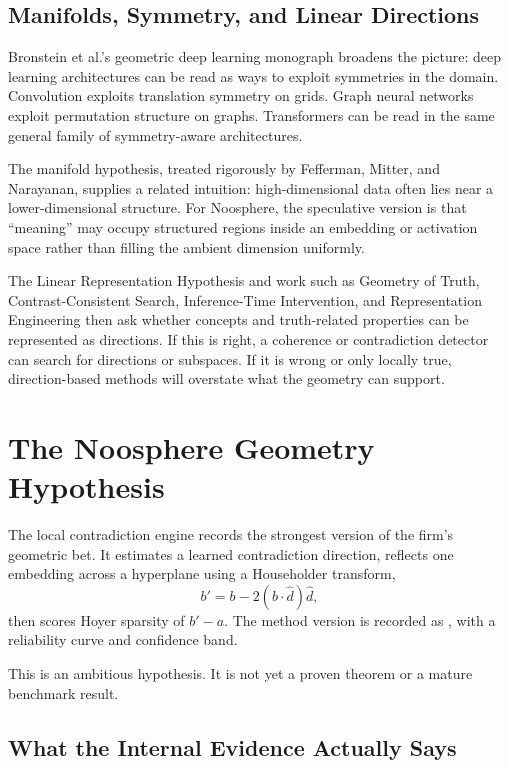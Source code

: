 \documentclass[11pt]{article}
\newcommand{\code}[1]{\texttt{\detokenize{#1}}}
\begin{document}
\subsection{Manifolds, Symmetry, and Linear Directions}

Bronstein et al.'s geometric deep learning monograph broadens the picture: deep
learning architectures can be read as ways to exploit symmetries in the domain.
Convolution exploits translation symmetry on grids. Graph neural networks
exploit permutation structure on graphs. Transformers can be read in the same
general family of symmetry-aware architectures.

The manifold hypothesis, treated rigorously by Fefferman, Mitter, and
Narayanan, supplies a related intuition: high-dimensional data often lies near a
lower-dimensional structure. For Noosphere, the speculative version is that
``meaning'' may occupy structured regions inside an embedding or activation
space rather than filling the ambient dimension uniformly.

The Linear Representation Hypothesis and work such as Geometry of Truth,
Contrast-Consistent Search, Inference-Time Intervention, and Representation
Engineering then ask whether concepts and truth-related properties can be
represented as directions. If this is right, a coherence or contradiction
detector can search for directions or subspaces. If it is wrong or only locally
true, direction-based methods will overstate what the geometry can support.

\section{The Noosphere Geometry Hypothesis}

The local contradiction engine records the strongest version of the firm's
geometric bet. It estimates a learned contradiction direction, reflects one
embedding across a hyperplane using a Householder transform,
\[
  b' = b - 2(b \cdot \hat d)\hat d,
\]
then scores Hoyer sparsity of $b' - a$. The method version is recorded as
\code{geometry/householder/v2}, with a reliability curve and confidence band.

This is an ambitious hypothesis. It is not yet a proven theorem or a mature
benchmark result.

\subsection{What the Internal Evidence Actually Says}
\end{document}

